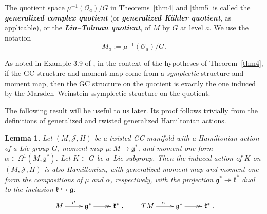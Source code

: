 \documentclass[pdftex]{sigma}
\newtheorem{Lemma}[Theorem]{Lemma}
\numberwithin{equation}{section}
\newcommand{\deff}[1]{\textbf{\emph{#1}}}
\newcommand{\func}[3]{#1 \colon #2 \to #3}
\newcommand{\tang}{T}
\begin{document}
\begin{Definition}
The quotient space $\mu^{-1}(\mathcal{O}_a) / G$ in Theorems~\ref{thm4} and \ref{thm5} is called the \deff{gene\-ralized complex quotient} (or \deff{generalized K\"ahler quotient}, as applicable), or the \deff{Lin--Tolman quotient}, of $M$ by $G$ at level $a$.  We use the notation
\[
  M_a := \mu^{-1}(\mathcal{O}_a) / G.
\]
\end{Definition}


\begin{Remark}
As noted in Example 3.9 of \cite{lintolman}, in the context of the hypotheses of Theorem~\ref{thm4}, if the GC structure and moment map come from a \emph{symplectic} structure and moment map, then the GC structure on the quotient is exactly the one induced by the Marsden--Weinstein ssymplectic structure on the quotient.
\end{Remark}


The following result will be useful to us later.  Its proof follows trivially from the def\/initions of generalized and twisted generalized Hamiltonian actions.


\begin{Lemma} \label{lem6}
Let $(M,\mathcal{J},H)$ be a twisted GC manifold with a Hamiltonian action of a Lie group $G$, moment map $\func{\mu}{M}{\mathfrak{g}^*}$, and moment one-form $\alpha \in \Omega^1(M,\mathfrak{g}^*)$.
Let $K \subset G$ be a~Lie subgroup.
Then the induced action of $K$ on $(M,\mathcal{J},H)$ is also Hamiltonian, with generalized moment map and moment one-form the compositions of $\mu$ and $\alpha$, respectively, with the projection $\mathfrak{g}^* \twoheadrightarrow \mathfrak{k}^*$ dual to the inclusion $\mathfrak{k} \hookrightarrow \mathfrak{g}$:
  \[
    \xymatrix{
      M \ar[r]^{\mu} & \mathfrak{g}^* \ar@{>>}[r] & \mathfrak{k}^*
    },
    \qquad
    \xymatrix{
      \tang M \ar[r]^{\alpha}
      & \mathfrak{g}^* \ar@{>>}[r] & \mathfrak{k}^*
    }.
  \]
\end{Lemma}
\end{document}
